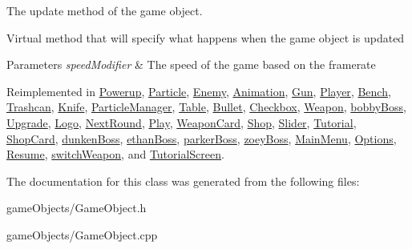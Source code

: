 The update method of the game object. 

Virtual method that will specify what happens when the game object is updated 
\begin{DoxyParams}{Parameters}
{\em speed\+Modifier} & The speed of the game based on the framerate \\
\hline
\end{DoxyParams}


Reimplemented in \hyperlink{class_powerup_a9e2f40a979bbc15787a607871b6644ce}{Powerup}, \hyperlink{class_particle_a9bd18a091946b1814f685118dfe66a1e}{Particle}, \hyperlink{class_enemy_a5509b06f70a649c4ea9d1fb06f07cb5c}{Enemy}, \hyperlink{class_animation_ae17ebf5f4b47801e460eb63342d858e8}{Animation}, \hyperlink{class_gun_ae7cbc34b103c1e89b4536309582dafb5}{Gun}, \hyperlink{class_player_a70e7b6ef62c5b8080e454edcb15cacc8}{Player}, \hyperlink{class_bench_abb815aa9afeee6e72fa93db3d51cf1a1}{Bench}, \hyperlink{class_trashcan_a6d44d844ec5c4155158b4e4d5fc222a4}{Trashcan}, \hyperlink{class_knife_ac861c5829858e00f82cbfdddb4a7d0b4}{Knife}, \hyperlink{class_particle_manager_a2c786926fc1cd9992c518b3ea4ee07cb}{Particle\+Manager}, \hyperlink{class_table_af37e903447fa51718b7ad49dd2d4dbc3}{Table}, \hyperlink{class_bullet_acfcfcf7146d04ad78520292c55ca6eee}{Bullet}, \hyperlink{class_checkbox_af8103187e6df3f44b010a098d7473b55}{Checkbox}, \hyperlink{class_weapon_a098b1074ff1099e9fbd83d1186b8f18f}{Weapon}, \hyperlink{classbobby_boss_a1ba19c55017f2fb3f0b1679d82095d78}{bobby\+Boss}, \hyperlink{class_upgrade_a66b04bde03bdf6ad0935b98963619444}{Upgrade}, \hyperlink{class_logo_a3c7f6eb9479e2594652d2a2f60c77e21}{Logo}, \hyperlink{class_next_round_ab6c2cb6a601f19c9898f962973c765c2}{Next\+Round}, \hyperlink{class_play_ae8b65105669a71c09901aae7b7e6f764}{Play}, \hyperlink{class_weapon_card_a160dc14db9e74b67537e74fcbf0a6e75}{Weapon\+Card}, \hyperlink{class_shop_a80125375c97c1028281e9458885ac0f0}{Shop}, \hyperlink{class_slider_a762b3a7ca00a3a665a1aeceba2e54fac}{Slider}, \hyperlink{class_tutorial_aeaa7fe8ebcd65dc23ca2df5c73ba5a48}{Tutorial}, \hyperlink{class_shop_card_a3f71274bdfc6c739969439975a3f0711}{Shop\+Card}, \hyperlink{classdunken_boss_ad9ae91ab3ce0b97ee48ab90203c7e4fd}{dunken\+Boss}, \hyperlink{classethan_boss_a6e47b12c5e718ecee5d888bcde580c1a}{ethan\+Boss}, \hyperlink{classparker_boss_a5f82194f8880924981fccd4bf611f324}{parker\+Boss}, \hyperlink{classzoey_boss_aa712b8f9050e3851cb0133927acd3f54}{zoey\+Boss}, \hyperlink{class_main_menu_a41b86746c468d18532123dfda01425de}{Main\+Menu}, \hyperlink{class_options_aa331e18456d83724b67f94a0827118c4}{Options}, \hyperlink{class_resume_a79207ae2fa394f8a2d0754fef119854d}{Resume}, \hyperlink{classswitch_weapon_a63fe71ba783dce920b6180efb2258735}{switch\+Weapon}, and \hyperlink{class_tutorial_screen_a67f9d997c5702c3ee032d7070d6363ec}{Tutorial\+Screen}.



The documentation for this class was generated from the following files\+:\begin{DoxyCompactItemize}
\item 
game\+Objects/Game\+Object.\+h\item 
game\+Objects/Game\+Object.\+cpp\end{DoxyCompactItemize}
